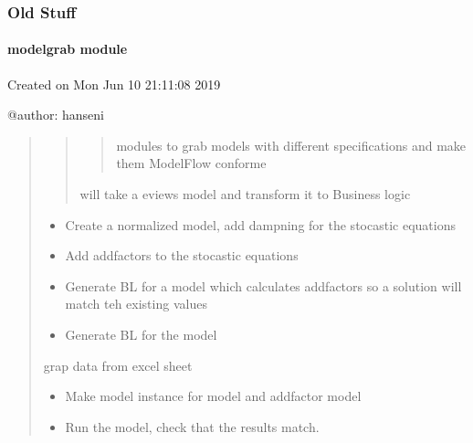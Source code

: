 \documentclass[letterpaper,10pt,english]{sphinxmanual}
\begin{document}
\subsubsection{Old Stuff}
\label{\detokenize{onboard/onboard:old-stuff}}
\sphinxstepscope


\paragraph{modelgrab module}
\label{\detokenize{onboard/modelgrab:module-modelgrab}}\label{\detokenize{onboard/modelgrab:modelgrab-module}}\label{\detokenize{onboard/modelgrab::doc}}
\sphinxAtStartPar
Created on Mon Jun 10 21:11:08 2019

\sphinxAtStartPar
@author: hanseni
\begin{quote}
\begin{quote}
\begin{quote}

\sphinxAtStartPar
modules to grab models with different specifications and make them ModelFlow conforme
\end{quote}

\sphinxAtStartPar
{} will take a eviews model  and transform it to Business logic
\end{quote}
\begin{itemize}
\item {} 
\sphinxAtStartPar
Create a normalized model, add dampning for the stocastic equations

\item {} 
\sphinxAtStartPar
Add add\sphinxhyphen{}factors to the stocastic equations

\item {} 
\sphinxAtStartPar
Generate BL for a model which calculates add\sphinxhyphen{}factors so a solution will match teh existing values

\item {} 
\sphinxAtStartPar
Generate BL for the model

\end{itemize}

\sphinxAtStartPar
\sphinxhyphen{}grap data from excel sheet
\begin{itemize}
\item {} 
\sphinxAtStartPar
Make model instance for model and add\sphinxhyphen{}factor model

\item {} 
\sphinxAtStartPar
Run the model, check that the results match.

\end{itemize}
\end{quote}
\end{document}
